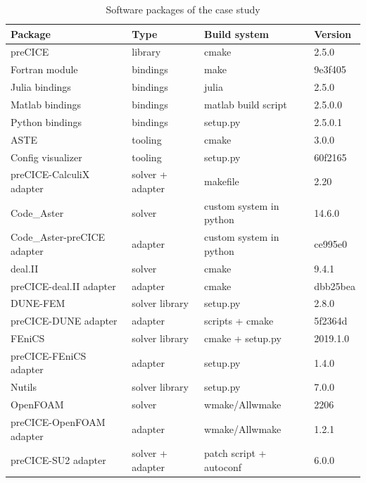 \documentclass{eceasst}
\begin{document}
\begin{table}[!t]
  \normalsize
  \caption{Software packages of the case study}
  \label{table:label-distribution}
  \centering
  \begin{tabular}{|l|l|l|l|}
    \hline
    \bfseries Package & \bfseries Type & \bfseries Build system & \bfseries Version \\ \hline
    preCICE & library & cmake & 2.5.0 \\ \hline
    Fortran module & bindings & make & 9e3f405 \\ \hline
    Julia bindings & bindings & julia & 2.5.0 \\ \hline
    Matlab bindings & bindings & matlab build script & 2.5.0.0 \\ \hline
    Python bindings & bindings & setup.py & 2.5.0.1 \\ \hline
    ASTE & tooling & cmake & 3.0.0 \\ \hline
    Config visualizer & tooling & setup.py & 60f2165 \\ \hline
    preCICE-CalculiX adapter & solver + adapter & makefile & 2.20 \\ \hline
    Code\_Aster & solver & custom system in python & 14.6.0 \\ \hline
    Code\_Aster-preCICE adapter & adapter & custom system in python & ce995e0 \\ \hline
    deal.II & solver & cmake & 9.4.1 \\ \hline
    preCICE-deal.II adapter & adapter & cmake & dbb25bea \\ \hline
    DUNE-FEM & solver library & setup.py & 2.8.0 \\ \hline
    preCICE-DUNE adapter& adapter & scripts + cmake & 5f2364d \\ \hline
    FEniCS & solver library& cmake + setup.py & 2019.1.0 \\ \hline
    preCICE-FEniCS adapter & adapter & setup.py & 1.4.0 \\ \hline
    Nutils & solver library & setup.py & 7.0.0 \\ \hline
    OpenFOAM & solver & wmake/Allwmake & 2206 \\ \hline
    preCICE-OpenFOAM adapter & adapter & wmake/Allwmake & 1.2.1 \\ \hline
    preCICE-SU2 adapter & solver + adapter & patch script + autoconf & 6.0.0 \\ \hline
  \end{tabular}
\end{table}
\end{document}
